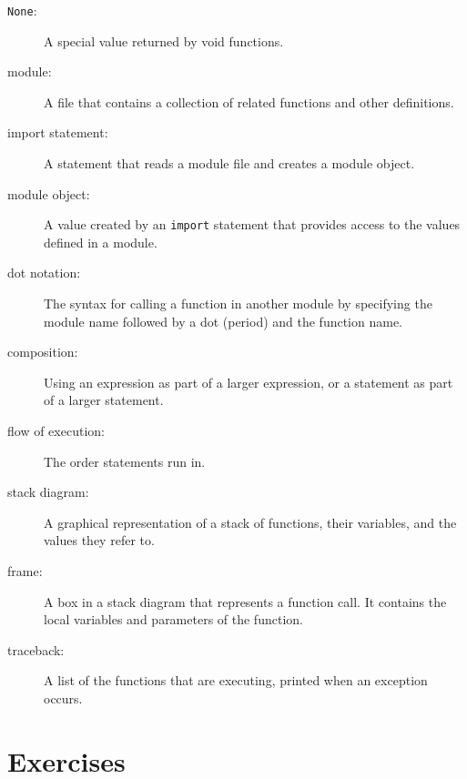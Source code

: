 \begin{description}
\item[{\tt None}:]  A special value returned by void functions.

\item[module:] A file that contains a
collection of related functions and other definitions.

\item[import statement:] A statement that reads a module file and creates
a module object.

\item[module object:] A value created by an {\tt import} statement
that provides access to the values defined in a module.

\item[dot notation:]  The syntax for calling a function in another
module by specifying the module name followed by a dot (period) and
the function name.

\item[composition:] Using an expression as part of a larger expression,
or a statement as part of a larger statement.

\item[flow of execution:]  The order statements run in.

\item[stack diagram:]  A graphical representation of a stack of functions,
their variables, and the values they refer to.

\item[frame:]  A box in a stack diagram that represents a function call.
It contains the local variables and parameters of the function.

\item[traceback:]  A list of the functions that are executing,
printed when an exception occurs.


\end{description}


%
\section{Exercises}

